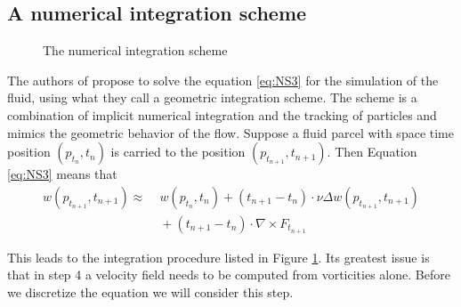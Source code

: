 \subsection{A numerical integration scheme}

\begin{figure}[t]
\begin{center}\end{center}
\caption{The numerical integration scheme}
\label{fig:fd_numericalIntegration}
\end{figure}


The authors of  propose to solve the equation \ref{eq:NS3} for the simulation of the fluid, using what they call a geometric integration scheme. The scheme is a combination of implicit numerical integration and the tracking of particles and mimics the geometric behavior of the flow. Suppose a fluid parcel with space time position $(p_{t_n},t_n)$ is carried to the position $(p_{t_{n+1}},t_{n+1})$. Then Equation \ref{eq:NS3} means that
\begin{align}w(p_{t_{n+1}},t_{n+1}) \approx \;& w(p_{t_n},t_n) + (t_{n+1}-t_n) \cdot \nu \Delta w(p_{t_{n+1}},t_{n+1}) \nonumber \\ &{}+ (t_{n+1}-t_n) \cdot\nabla \times F_{t_{n+1}}\label{eq:vortDiffusion}\end{align}


This leads to the integration procedure listed in Figure \ref{fig:fd_numericalIntegration}. Its greatest issue is that in step 4 a velocity field needs to be computed from vorticities alone. Before we discretize the equation we will consider this step.

